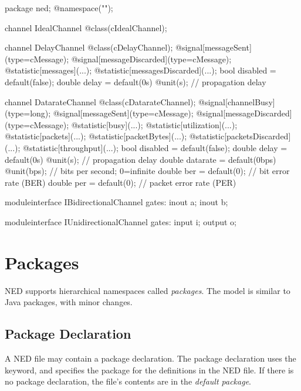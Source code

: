 \begin{ned}
package ned;
@namespace("");

channel IdealChannel
{
    @class(cIdealChannel);
}

channel DelayChannel
{
    @class(cDelayChannel);
    @signal[messageSent](type=cMessage);
    @signal[messageDiscarded](type=cMessage);
    @statistic[messages](...);
    @statistic[messagesDiscarded](...);
    bool disabled = default(false);
    double delay = default(0s) @unit(s); // propagation delay
}

channel DatarateChannel
{
    @class(cDatarateChannel);
    @signal[channelBusy](type=long);
    @signal[messageSent](type=cMessage);
    @signal[messageDiscarded](type=cMessage);
    @statistic[busy](...);
    @statistic[utilization](...);
    @statistic[packets](...);
    @statistic[packetBytes](...);
    @statistic[packetsDiscarded](...);
    @statistic[throughput](...);
    bool disabled = default(false);
    double delay = default(0s) @unit(s); // propagation delay
    double datarate = default(0bps) @unit(bps); // bits per second; 0=infinite
    double ber = default(0); // bit error rate (BER)
    double per = default(0); // packet error rate (PER)
}

moduleinterface IBidirectionalChannel
{
    gates:
        inout a;
        inout b;
}

moduleinterface IUnidirectionalChannel
{
    gates:
        input i;
        output o;
}
\end{ned}



\section{Packages}
\label{sec:ned-ref:packages}

NED supports hierarchical namespaces called \textit{packages}. The model
is similar to Java packages, with minor changes.


\subsection{Package Declaration}
\label{sec:ned-ref:package-declaration}

A NED file may contain a package declaration. The package declaration
uses the  keyword, and specifies the package for the
definitions in the NED file. If there is no package declaration, the file's
contents are in the \textit{default package}.

